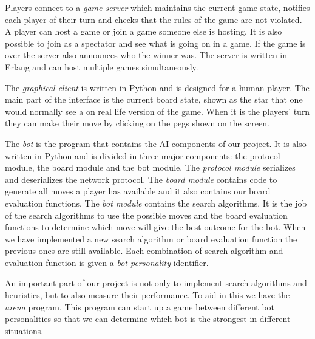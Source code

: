 \documentclass[a4paper,11pt]{article}
\begin{document}
Players connect to a \emph{game server} which maintains the current
game state, notifies each player of their turn and checks that the
rules of the game are not violated. A player can host a game or join a
game someone else is hosting. It is also possible to join as a
spectator and see what is going on in a game. If the game is over the
server also announces who the winner was. The server is written in
Erlang and can host multiple games simultaneously.

The \emph{graphical client} is written in Python and is designed for a
human player. The main part of the interface is the current board
state, shown as the star that one would normally see a on real life
version of the game. When it is the players' turn they can make their
move by clicking on the pegs shown on the screen.

The \emph{bot} is the program that contains the AI components of our
project. It is also written in Python and is divided in three major
components: the protocol module, the board module and the bot module.
The \emph{protocol module} serializes and deserializes the network protocol.
The \emph{board module} contains code to generate all moves a player has
available and it also contains our board evaluation functions. The
\emph{bot module} contains the search algorithms. It is the job of the search
algorithms to use the possible moves and the board evaluation
functions to determine which move will give the best outcome for the
bot. When we have implemented a new search algorithm or board
evaluation function the previous ones are still available. Each
combination of search algorithm and evaluation function is given a
\emph{bot personality} identifier.

An important part of our project is not only to implement search
algorithms and heuristics, but to also measure their performance. To
aid in this we have the \emph{arena} program. This program can start
up a game between different bot personalities so that we can determine
which bot is the strongest in different situations.


\end{document}
